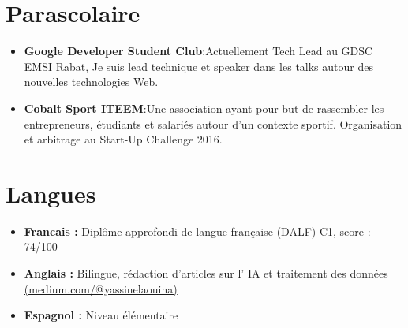 \documentclass[a4paper,11pt]{article}
\newcommand{\resumeItem}[2]{
  \item{
    \textbf{#1}{:\hspace{0.5mm}#2 \vspace{-0.5mm}}
  }
}
\newcommand{\resumeSubItem}[2]{\resumeItem{#1}{#2}\vspace{-4pt}}
\newcommand{\resumeHeadingSkillStart}{\begin{itemize}[leftmargin=*,itemsep=1.7mm, rightmargin=2ex]}
\newcommand{\resumeItemListStart}{\begin{justify}\begin{itemize}[leftmargin=3ex, rightmargin=2ex, noitemsep,labelsep=1.2mm,itemsep=0mm]\small}
\newcommand{\resumeHeadingSkillEnd}{\end{itemize}\vspace{-2mm}}
\newcommand{\resumeItemListEnd}{\end{itemize}\end{justify}\vspace{-2mm}}
\begin{document}
\section{\textbf{Parascolaire}}
\resumeHeadingSkillStart
 \resumeSubItem{Google Developer Student Club} 
    {Actuellement Tech Lead au GDSC EMSI Rabat, Je suis lead technique et speaker dans les talks autour des nouvelles technologies Web.}
    
 \resumeSubItem{Cobalt Sport ITEEM}
 {Une association ayant pour but de rassembler les entrepreneurs, étudiants et salariés autour d'un contexte sportif. Organisation et arbitrage au Start-Up Challenge 2016. }


\resumeHeadingSkillEnd
\vspace{-3mm}

\section{\textbf{Langues}}
    \resumeItemListStart
        \item {{\textbf{ Francais :}}}
        {Diplôme approfondi de langue française (DALF) C1, score : 74/100 }
        \item {{\textbf{ Anglais : }}}
        {Bilingue, rédaction d'articles sur l' IA et traitement des données \href{https://medium.com/@yassinelaouina}{(medium.com/@yassinelaouina)}}
        \item {{\textbf{ Espagnol :}}}
        {Niveau élémentaire}
    \resumeItemListEnd
\vspace{-4mm}
\end{document}
